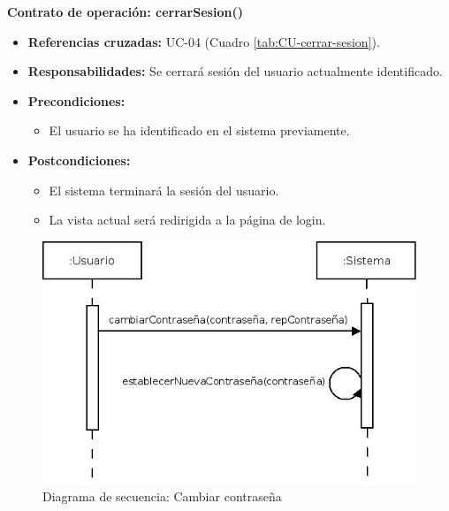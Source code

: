 \textbf{Contrato de operación: cerrarSesion()}
\begin{itemize}
\item \textbf{Referencias cruzadas:} UC-04 (Cuadro \ref{tab:CU-cerrar-sesion}).
\item \textbf{Responsabilidades:} Se cerrará sesión del usuario actualmente identificado.
\item \textbf{Precondiciones:} 
 \begin{itemize}
\item El usuario se ha identificado en el sistema previamente.
\end {itemize}
\item \textbf{Postcondiciones:} 
 \begin{itemize}
\item El sistema terminará la sesión del usuario.
\item La vista actual será redirigida a la página de login.
\end {itemize}
\end {itemize}


\vspace{10mm}

\begin{figure}[H]
\centering
  \includegraphics[scale=.55]{img/secuencias/gestion-usuarios-cambiar-contrasena.jpeg}
  \caption{Diagrama de secuencia: Cambiar contraseña}
  \label{fig:secuencia-gestion-usuarios-cambiar-contrasena}
\end{figure}

